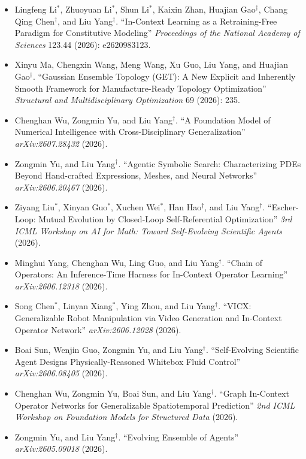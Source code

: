 \begin{itemize}[leftmargin=*]
\item Lingfeng Li$^*$, Zhuoyuan Li$^*$, Shun Li$^*$, Kaixin Zhan, Huajian Gao$^\dagger$, Chang Qing Chen$^\dagger$, and {Liu Yang}$^\dagger$. ``In-Context Learning as a Retraining-Free Paradigm for Constitutive Modeling'' \textit{Proceedings of the National Academy of Sciences} 123.44 (2026): e2620983123.
\item Xinyu Ma, Chengxin Wang, Meng Wang, Xu Guo, {Liu Yang}, and Huajian Gao$^\dagger$. ``Gaussian Ensemble Topology (GET): A New Explicit and Inherently Smooth Framework for Manufacture-Ready Topology Optimization'' \textit{Structural and Multidisciplinary Optimization} 69 (2026): 235.
\item Chenghan Wu, Zongmin Yu, and {Liu Yang}$^\dagger$. ``A Foundation Model of Numerical Intelligence with Cross-Disciplinary Generalization'' \textit{arXiv:2607.28432} (2026).
\item Zongmin Yu, and {Liu Yang}$^\dagger$. ``Agentic Symbolic Search: Characterizing PDEs Beyond Hand-crafted Expressions, Meshes, and Neural Networks'' \textit{arXiv:2606.20467} (2026).
\item Ziyang Liu$^*$, Xinyan Guo$^*$, Xuchen Wei$^*$, Han Hao$^\dagger$, and {Liu Yang}$^\dagger$. ``Escher-Loop: Mutual Evolution by Closed-Loop Self-Referential Optimization'' \textit{3rd ICML Workshop on AI for Math: Toward Self-Evolving Scientific Agents} (2026).
\item Minghui Yang, Chenghan Wu, Ling Guo, and {Liu Yang}$^\dagger$. ``Chain of Operators: An Inference-Time Harness for In-Context Operator Learning'' \textit{arXiv:2606.12318} (2026).
\item Song Chen$^*$, Linyan Xiang$^*$, Ying Zhou, and {Liu Yang}$^\dagger$. ``VICX: Generalizable Robot Manipulation via Video Generation and In-Context Operator Network'' \textit{arXiv:2606.12028} (2026).
\item Boai Sun, Wenjin Guo, Zongmin Yu, and {Liu Yang}$^\dagger$. ``Self-Evolving Scientific Agent Designs Physically-Reasoned Whitebox Fluid Control'' \textit{arXiv:2606.08405} (2026).
\item Chenghan Wu, Zongmin Yu, Boai Sun, and {Liu Yang}$^\dagger$. ``Graph In-Context Operator Networks for Generalizable Spatiotemporal Prediction'' \textit{2nd ICML Workshop on Foundation Models for Structured Data} (2026).
\item Zongmin Yu, and {Liu Yang}$^\dagger$. ``Evolving Ensemble of Agents'' \textit{arXiv:2605.09018} (2026).

\end{itemize}
